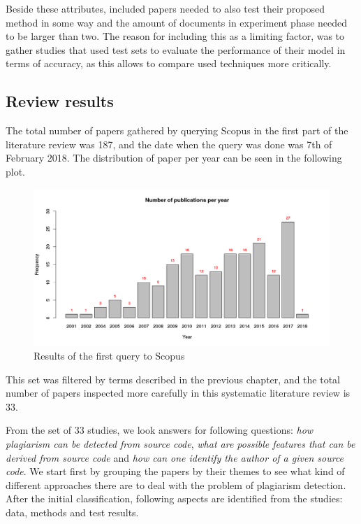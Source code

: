 Beside these attributes, included papers needed to also test their proposed method in some way and the amount of documents in experiment phase needed to be larger than two. The reason for including this as a limiting factor, was to gather studies that used test sets to evaluate the performance of their model in terms of accuracy, as this allows to compare used techniques more critically. 


\subsection{Review results}

The total number of papers gathered by querying Scopus in the first part of the literature review was 187, and the date when the query was done was 7th of February 2018. The distribution of paper per year can be seen in the following plot.

\begin{figure}[h]
\centering
\includegraphics[width=\textwidth]{plots/Rplot.png}
\caption{Results of the first query to Scopus}
\end{figure}

\noindent
This set was filtered by terms described in the previous chapter, and the total number of papers inspected more carefully in this systematic literature review is 33. 

From the set of 33 studies, we look answers for following questions: \emph{how plagiarism can be detected from source code}, \emph{what are possible features that can be derived from source code} and \emph{how can one identify the author of a given source code}. We start first by grouping the papers by their themes to see what kind of different approaches there are to deal with the problem of plagiarism detection. After the initial classification, following aspects are identified from the studies: data, methods and test results. 



